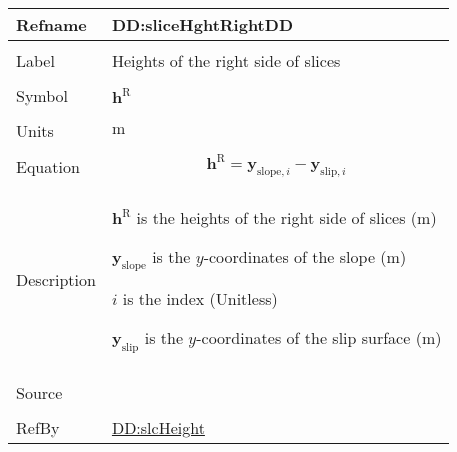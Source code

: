 \documentclass[12pt]{article}
\begin{document}
\vspace{\baselineskip}
\noindent
\begin{minipage}{\textwidth}
\begin{tabular}{>{\raggedright}p{}>{\raggedright\arraybackslash}p{}}
\toprule \textbf{Refname} & \textbf{DD:sliceHghtRightDD}
\label{DD:sliceHghtRightDD}
\\ \midrule \\
Label & Heights of the right side of slices
        
\\ \midrule \\
Symbol & ${\symbf{h}^{\text{R}}}$
         
\\ \midrule \\
Units & ${\text{m}}$
        
\\ \midrule \\
Equation & \begin{displaymath}
           {\symbf{h}^{\text{R}}}={\symbf{y}_{\text{slope},i}}-{\symbf{y}_{\text{slip},i}}
           \end{displaymath}
\\ \midrule \\
Description & \begin{symbDescription}
              \item{${\symbf{h}^{\text{R}}}$ is the heights of the right side of slices (${\text{m}}$)}
              \item{${\symbf{y}_{\text{slope}}}$ is the $y$-coordinates of the slope (${\text{m}}$)}
              \item{$i$ is the index (Unitless)}
              \item{${\symbf{y}_{\text{slip}}}$ is the $y$-coordinates of the slip surface (${\text{m}}$)}
              \end{symbDescription}
\\ \midrule \\
Source & \cite{fredlund1977}
         
\\ \midrule \\
RefBy & \hyperref[DD:slcHeight]{DD:slcHeight}
        
\\ \bottomrule
\end{tabular}
\end{minipage}
\end{document}
